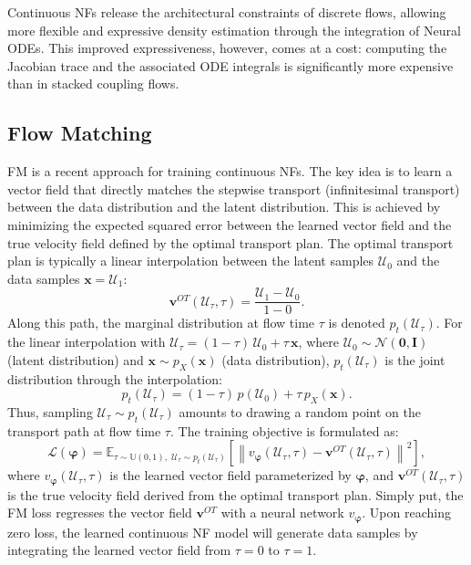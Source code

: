 Continuous \acp{NF} release the architectural constraints of discrete flows, allowing more flexible and expressive density estimation through the integration of Neural \acp{ODE}. This improved expressiveness, however, comes at a cost: computing the Jacobian trace and the associated ODE integrals is significantly more expensive than in stacked coupling flows.

\subsection{Flow Matching}
\label{sec:flowmatching}
\ac{FM} \citep{lipman2023flowmatching} is a recent approach for training continuous \acp{NF}. The key idea is to learn a vector field that directly matches the stepwise transport (infinitesimal transport) between the data distribution and the latent distribution. This is achieved by minimizing the expected squared error between the learned vector field and the true velocity field defined by the optimal transport plan. The optimal transport plan is typically a linear interpolation between the latent samples $\mathcal{U}_0$ and the data samples $\boldsymbol{x}=\mathcal{U}_1$:
\begin{equation}
    \boldsymbol{v}^{OT}(\mathcal{U}_\tau, \tau) = \frac{\mathcal{U}_1-\mathcal{U}_0}{1 - 0}.
\end{equation}
Along this path, the marginal distribution at flow time $\tau$ is denoted $p_t(\mathcal{U}_\tau)$. For the linear interpolation with $\mathcal{U}_\tau = (1-\tau)\,\mathcal{U}_0 + \tau\,\boldsymbol{x}$, where $\mathcal{U}_0 \sim \mathcal{N}(\boldsymbol{0}, \boldsymbol{I})$ (latent distribution) and $\boldsymbol{x} \sim p_X(\boldsymbol{x})$ (data distribution), $p_t(\mathcal{U}_\tau)$ is the joint distribution through the interpolation:
\begin{equation}
    p_t(\mathcal{U}_\tau) = (1-\tau)\,p(\mathcal{U}_0) + \tau\,p_X(\boldsymbol{x}).
\end{equation}
Thus, sampling $\mathcal{U}_\tau \sim p_t(\mathcal{U}_\tau)$ amounts to drawing a random point on the transport path at flow time $\tau$.  The training objective is formulated as:
\begin{equation}
    \mathcal{L}(\boldsymbol{\varphi}) = \mathbb{E}_{\tau\sim\mathbb{U}(0,1),\;\mathcal{U}_\tau\sim p_t(\mathcal{U}_\tau)}\left[\left\|v_{\boldsymbol{\varphi}}(\mathcal{U}_\tau, \tau) - \boldsymbol{v}^{OT}(\mathcal{U}_\tau, \tau)\right\|^2\right],
\end{equation}
where $v_{\boldsymbol{\varphi}}(\mathcal{U}_\tau, \tau)$ is the learned vector field parameterized by $\boldsymbol{\varphi}$, and $\boldsymbol{v}^{OT}(\mathcal{U}_\tau, \tau)$ is the true velocity field derived from the optimal transport plan. Simply put, the \ac{FM} loss regresses the vector field $\boldsymbol{v}^{OT}$ with a neural network $v_{\boldsymbol{\varphi}}$. Upon reaching zero loss, the learned continuous \ac{NF} model will generate data samples by integrating the learned vector field from $\tau=0$ to $\tau=1$. 

